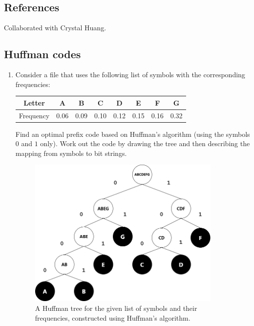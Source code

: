 \def\lc{\left\lceil}   
\def\rc{\right\rceil}
\runningheadrule
\firstpageheadrule
\cfoot{}
\subsection*{References}
Collaborated with Crystal Huang.
\subsection{Huffman codes}
\begin{enumerate}
\item 
Consider a file that uses the following list of symbols with the corresponding frequencies:
\begin{center}
\begin{tabular}{|c|c|c|c|c|c|c|c|}
\hline
     Letter & A & B & C & D & E & F & G\\
     \hline 
     Frequency & 0.06 & 0.09 & 0.10 & 0.12 & 0.15 & 0.16 & 0.32\\
     \hline
\end{tabular}
\end{center}

\noindent Find an optimal prefix code based on Huffman's algorithm (using the symbols $0$ and $1$ only). Work out the code by drawing the tree and then describing the mapping from symbols to bit strings.
\begin{figure}[h]
\centering
\includegraphics[width=9.5cm]{../images/hw7-1-1.png}
\caption{A Huffman tree for the given list of symbols and their frequencies, constructed using Huffman's algorithm.}
\label{fig:hw7_1_1}
\end{figure}


\end{enumerate}
